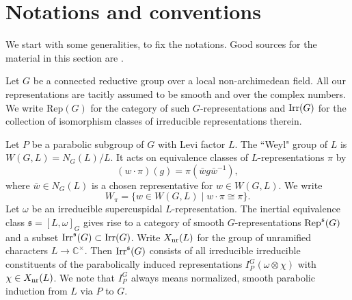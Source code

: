 \documentclass[11pt]{amsart}
\theoremstyle{definition}
\begin{document}
\section{Notations and conventions}
\label{sec:not}

We start with some generalities, to fix the notations. Good sources for the material
in this section are \cite{Ren,BuKu3}.

Let $G$ be a connected
reductive group over a local non-archimedean field. All our representations are
tacitly assumed to be smooth and over the complex numbers.
We write Rep$(G)$ for the category of such $G$-representations and ${{\rm Irr}} (G)$ for
the collection of isomorphism classes of irreducible representations therein.

Let $P$ be a parabolic subgroup of $G$ with Levi factor $L$. The ``Weyl" group of
$L$ is $W(G,L) = N_G (L) / L$. It acts on equivalence classes of $L$-representations
$\pi$ by
\[
(w \cdot \pi) (g) = \pi (\bar w g \bar{w}^{-1}) , 
\]
where $\bar w \in N_G (L)$ is a chosen representative for $w \in W(G,L)$. 
We write \label{i:67}
\[
W_\pi = \{ w \in W(G,L) \mid w \cdot \pi \cong \pi \} . 
\]
Let $\omega$ be an irreducible supercuspidal $L$-representation. 
The inertial equivalence class ${{\mathfrak s}} = [L,\omega]_G$ gives rise to a category of smooth 
$G$-representations ${{\rm Rep}}^{{\mathfrak s}} (G)$ and a subset ${{\rm Irr}}^{{\mathfrak s}} (G) \subset {{\rm Irr}} (G)$.
Write $X_{{\rm nr}} (L)$ for the group of unramified characters $L \to {\mathbb C}^\times$. \label{i:80}
Then ${{\rm Irr}}^{{\mathfrak s}} (G)$ consists of all irreducible irreducible constituents of the
parabolically induced representations $I_P^G (\omega \otimes \chi)$ with
$\chi \in X_{{\rm nr}} (L)$. We note that $I_P^G$ always means normalized, smooth parabolic
induction from $L$ via $P$ to $G$.
\end{document}
